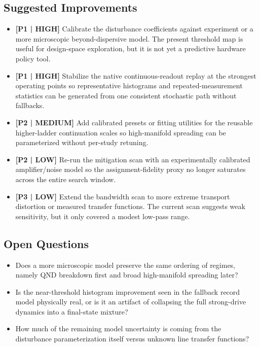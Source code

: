\documentclass[11pt, a4paper]{article}
\begin{document}
\subsection{Suggested Improvements}
\begin{itemize}
  \item \textbf{[P1 | HIGH]} Calibrate the disturbance coefficients against experiment or a more microscopic beyond-dispersive model. The present threshold map is useful for design-space exploration, but it is not yet a predictive hardware policy tool.
  \item \textbf{[P1 | HIGH]} Stabilize the native continuous-readout replay at the strongest operating points so representative histograms and repeated-measurement statistics can be generated from one consistent stochastic path without fallbacks.
  \item \textbf{[P2 | MEDIUM]} Add calibrated presets or fitting utilities for the reusable higher-ladder continuation scales so high-manifold spreading can be parameterized without per-study retuning.
  \item \textbf{[P2 | LOW]} Re-run the mitigation scan with an experimentally calibrated amplifier/noise model so the assignment-fidelity proxy no longer saturates across the entire search window.
  \item \textbf{[P3 | LOW]} Extend the bandwidth scan to more extreme transport distortion or measured transfer functions. The current scan suggests weak sensitivity, but it only covered a modest low-pass range.
\end{itemize}

\subsection{Open Questions}
\begin{itemize}
  \item Does a more microscopic model preserve the same ordering of regimes, namely QND breakdown first and broad high-manifold spreading later?
  \item Is the near-threshold histogram improvement seen in the fallback record model physically real, or is it an artifact of collapsing the full strong-drive dynamics into a final-state mixture?
  \item How much of the remaining model uncertainty is coming from the disturbance parameterization itself versus unknown line transfer functions?
\end{itemize}



\end{document}

